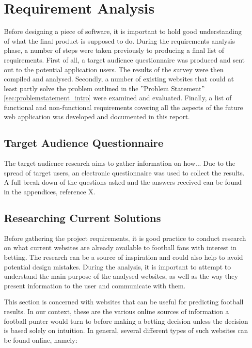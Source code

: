 \chapter{Requirement Analysis}
\label{ch:requirementanalysis}
Before designing a piece of software, it is important to hold good understanding of what the final product is supposed to do. During the requirements analysis phase, a number of steps were taken previously to producing a final list of requirements. First of all, a target audience questionnaire was produced and sent out to the potential application users. The results of the survey were then compiled and analysed. Secondly, a number of existing websites that could at least partly solve the problem outlined in the ”Problem Statement” \ref{sec:problemstatement_intro}  were examined and evaluated. Finally, a list of functional and non-functional requirements covering all the aspects of the future web application was developed and documented in this report.

\section{Target Audience Questionnaire}
\label{sec:targetaudiencequestionnaire_req}
The target audience research aims to gather information on how...
Due to the spread of target users, an electronic questionnaire was used to collect the results. A full break down of the questions asked and the answers received can be found in the appendices, reference X.

\section{Researching Current Solutions}
\label{sec:currentsolutions_req}
Before gathering the project requirements, it is good practice to conduct research on what current websites are already available to football fans with interest in betting. The research can be a source of inspiration and could also help to avoid potential design mistakes. During the analysis, it is important to attempt to understand the main purpose of the analysed websites, as well as the way they present information to the user and communicate with them. 

This section is concerned with websites that can be useful for predicting football results. In our context, these are the various online sources of information a football punter would turn to before making a betting decision unless the decision is based solely on intuition. In general, several different types of such websites can be found online, namely:
		
